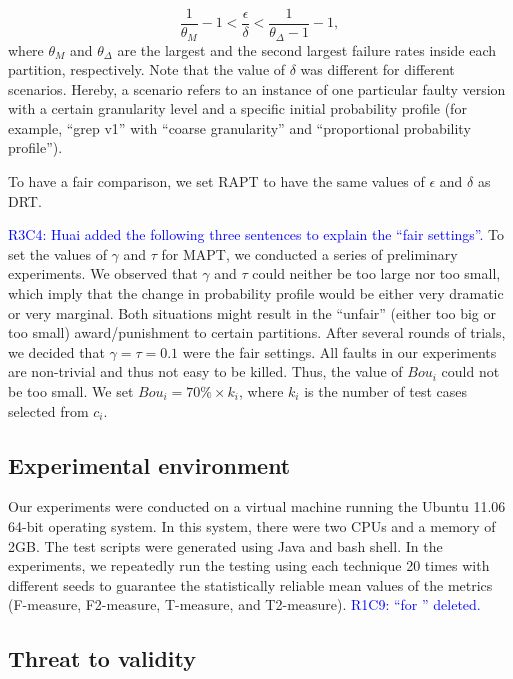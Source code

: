 \documentclass[10pt,journal,compsoc]{IEEEtran}
\begin{document}
\begin{equation}
\frac{1}{\theta_M}-1 < \frac{\epsilon}{\delta} < \frac{1}{\theta_\Delta-1}-1,
\end{equation}
where $\theta_M$ and $\theta_\Delta$ are the largest and the second largest failure rates inside each partition, respectively. Note that the value of $\delta$ was different for different scenarios. Hereby, a scenario refers to an instance of one particular faulty version with a certain granularity level and a specific initial probability profile (for example, ``grep v1'' with ``coarse granularity'' and ``proportional probability profile'').

To have a fair comparison, we set RAPT to have the same values of $\epsilon$ and $\delta$ as DRT.

\textcolor{blue}{R3C4: Huai added the following three sentences to explain the ``fair settings''.} To set the values of $\gamma$ and $\tau$ for MAPT, we conducted a series of preliminary experiments. We observed that $\gamma$ and $\tau$ could neither be too large nor too small, which imply that the change in probability profile would be either very dramatic or very marginal. Both situations might result in the ``unfair'' (either too big or too small) award/punishment to certain partitions. After several rounds of trials, we decided that $\gamma = \tau = 0.1$ were the fair settings. All faults in our experiments are non-trivial and thus not easy to be killed. Thus, the value of $Bou_i$ could not be too small. We set $Bou_i = 70\% \times k_i$, where $k_i$ is the number of test cases selected from $c_i$.

\subsection{Experimental environment}

Our experiments were conducted on a virtual machine running the Ubuntu 11.06 64-bit operating system. In this system, there were two CPUs and a memory of 2GB. The test scripts were generated using Java and bash shell. In the experiments, we repeatedly run the testing using each technique 20 times with different seeds to guarantee the statistically reliable mean values of the metrics (F-measure, F2-measure, T-measure, and T2-measure).  \textcolor{blue}{R1C9: ``for '' deleted.}

\subsection{Threat to validity}
\end{document}

